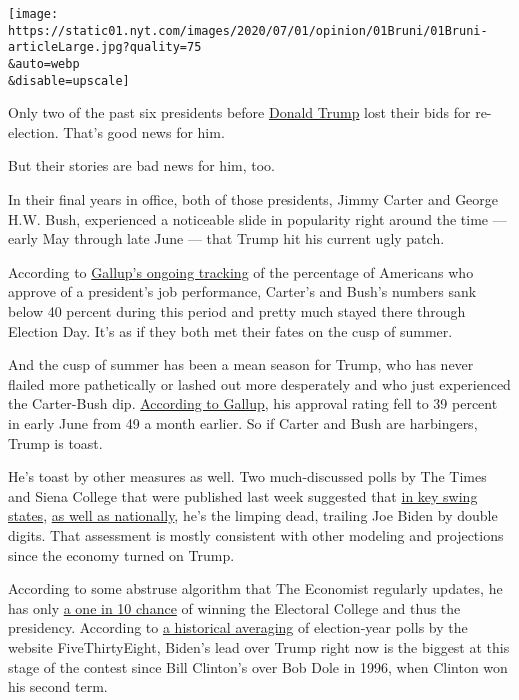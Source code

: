 \texttt{[image: https://static01.nyt.com/images/2020/07/01/opinion/01Bruni/01Bruni-articleLarge.jpg?quality=75\\\&auto=webp\\\&disable=upscale]}

Only two of the past six presidents before
\href{https://www.nytimes.com/2020/07/01/us/politics/trump-fundraising-2020.html}{Donald
Trump} lost their bids for re-election. That's good news for him.

But their stories are bad news for him, too.

In their final years in office, both of those presidents, Jimmy Carter
and George H.W. Bush, experienced a noticeable slide in popularity right
around the time --- early May through late June --- that Trump hit his
current ugly patch.

According to
\href{https://news.gallup.com/interactives/185273/presidential-job-approval-center.aspx}{Gallup's
ongoing tracking} of the percentage of Americans who approve of a
president's job performance, Carter's and Bush's numbers sank below 40
percent during this period and pretty much stayed there through Election
Day. It's as if they both met their fates on the cusp of summer.

And the cusp of summer has been a mean season for Trump, who has never
flailed more pathetically or lashed out more desperately and who just
experienced the Carter-Bush dip.
\href{https://news.gallup.com/poll/203198/presidential-approval-ratings-donald-trump.aspx}{According
to Gallup}, his approval rating fell to 39 percent in early June from 49
a month earlier. So if Carter and Bush are harbingers, Trump is toast.

He's toast by other measures as well. Two much-discussed polls by The
Times and Siena College that were published last week suggested that
\href{https://www.nytimes.com/2020/06/25/upshot/poll-2020-biden-battlegrounds.html}{in
key swing states},
\href{https://www.nytimes.com/2020/06/24/us/politics/trump-biden-poll-nyt-upshot-siena-college.html}{as
well as nationally}, he's the limping dead, trailing Joe Biden by double
digits. That assessment is mostly consistent with other modeling and
projections since the economy turned on Trump.

According to some abstruse algorithm that The Economist regularly
updates, he has only
\href{https://projects.economist.com/us-2020-forecast/president}{a one
in 10 chance} of winning the Electoral College and thus the presidency.
According to
\href{https://fivethirtyeight.com/features/biden-has-a-historically-large-lead-over-trump-but-it-could-disappear/?cid=taboola_rcc_r}{a
historical averaging} of election-year polls by the website
FiveThirtyEight, Biden's lead over Trump right now is the biggest at
this stage of the contest since Bill Clinton's over Bob Dole in 1996,
when Clinton won his second term.

